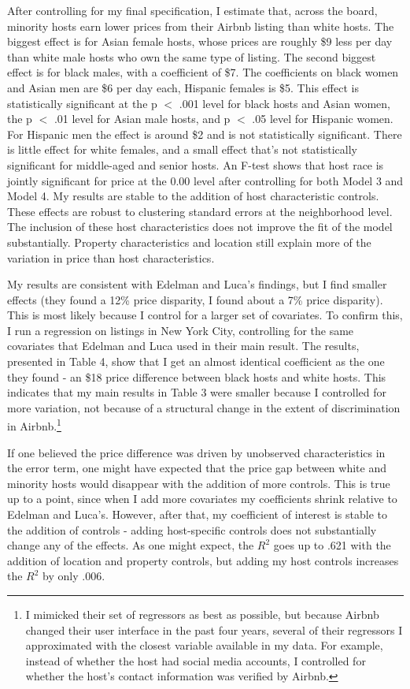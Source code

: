 \documentclass[11pt, oneside]{article}
\begin{document}
After controlling for my final specification, I estimate that, across the board, minority hosts earn lower prices from their Airbnb listing than white hosts. The biggest effect is for Asian female hosts, whose prices are roughly \$9 less per day than white male hosts who own the same type of listing. The second biggest effect is for black males, with a coefficient of \$7. The coefficients on black women and Asian men are \$6 per day each, Hispanic females is \$5. This effect is statistically significant at the p $<$ .001 level for black hosts and Asian women, the p $<$ .01 level for Asian male hosts, and p $<$ .05 level for Hispanic women. For Hispanic men the effect is around \$2 and is not statistically significant. There is little effect for white females, and a small effect that's not statistically significant for middle-aged and senior hosts. An F-test shows that host race is jointly significant for price at the 0.00 level after controlling for both Model 3 and Model 4. My results are stable to the addition of host characteristic controls. These effects are robust to clustering standard errors at the neighborhood level. The inclusion of these host characteristics does not improve the fit of the model substantially. Property characteristics and location still explain more of the variation in price than host characteristics. 

My results are consistent with Edelman and Luca's findings, but I find smaller effects (they found a 12\% price disparity, I found about a 7\% price disparity). This is most likely because I control for a larger set of covariates. To confirm this, I run a regression on listings in New York City, controlling for the same covariates that Edelman and Luca used in their main result. The results, presented in Table 4, show that I get an almost identical coefficient as the one they found - an \$18 price difference between black hosts and white hosts. This indicates that my main results in Table 3 were smaller because I controlled for more variation, not because of a structural change in the extent of discrimination in Airbnb.\footnote{I mimicked their set of regressors as best as possible, but because Airbnb changed their user interface in the past four years, several of their regressors I approximated with the closest variable available in my data. For example, instead of whether the host had social media accounts, I controlled for whether the host's contact information was verified by Airbnb.}

If one believed the price difference was driven by unobserved characteristics in the error term, one might have expected that the price gap between white and minority hosts would disappear with the addition of more controls. This is true up to a point, since when I add more covariates my coefficients shrink relative to Edelman and Luca's. However, after that, my coefficient of interest is stable to the addition of controls - adding host-specific controls does not substantially change any of the effects. As one might expect, the $R^2$ goes up to .621 with the addition of location and property controls, but adding my host controls increases the $R^2$ by only .006. 
\end{document}
